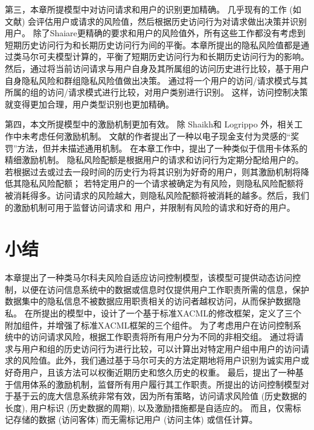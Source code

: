 第三，本章所提模型中对访问请求和用户的识别更加精确。 几乎现有的工作 (如文献\cite{wang2011quantified,shaikh2012dynamic}) 会评估用户或请求的风险值，然后根据历史访问行为对请求做出决策并识别用户。 除了Shaiare更精确的要求和用户的风险值外，所有这些工作都没有考虑到短期历史访问行为和长期历史访问行为间的平衡。本章所提出的隐私风险值都是通过类马尔可夫模型计算的，平衡了短期历史访问行为和长期历史访问行为的影响。 然后，通过将当前访问请求与用户自身及其所属组的访问历史进行比较，基于用户自身隐私风险和群组隐私风险值做出决策。 通过将一个用户的访问/请求模式与其所属的组的访问/请求模式进行比较，对用户类别进行识别。 这样，访问控制决策就变得更加合理，用户类型识别也更加精确。

第四，本文所提模型中的激励机制更加有效。 除 Shaikh和 Logrippo \cite{shaikh2012dynamic}外，相关工作中未考虑任何激励机制。 文献\cite{shaikh2012dynamic}的作者提出了一种以电子现金支付为灵感的“奖罚”方法，但并未描述通用机制。 在本章工作中，提出了一种类似于信用卡体系的精细激励机制。 隐私风险配额是根据用户的请求和访问行为定期分配给用户的。 若根据过去或过去一段时间的历史行为将其识别为好奇的用户，则其激励机制将降低其隐私风险配额； 若特定用户的一个请求被确定为有风险，则隐私风险配额将被消耗得多。访问请求的风险越大，则隐私风险配额将被消耗的越多。然后，我们的激励机制可用于监督访问请求和 用户，并限制有风险的请求和好奇的用户。

\section{小结}
\label{sec:Conclusion}

本章提出了一种类马尔科夫风险自适应访问控制模型，该模型可提供动态访问控制，以便在访问信息系统中的数据或信息时仅提供用户工作职责所需的信息，保护数据集中的隐私信息不被数据应用职责相关的访问者越权访问，从而保护数据隐私。 在所提出的模型中，设计了一个基于标准XACML的修改框架，定义了三个附加组件，并增强了标准XACML框架的三个组件。 为了考虑用户在访问控制系统中的访问请求风险，根据工作职责将所有用户分为不同的非相交组。 通过将请求与用户和组的历史访问行为进行比较，可以计算出对特定用户组中用户的访问请求的风险值。此外，我们通过基于马尔可夫的方法定期地将用户识别为诚实用户或好奇用户，且该方法可以权衡近期历史和悠久历史的权重。 最后，提出了一种基于信用体系的激励机制，监督所有用户履行其工作职责。所提出的访问控制模型对于基于云的庞大信息系统非常有效，因为所有策略，访问请求风险值 (历史数据的长度), 用户标识 (历史数据的周期), 以及激励措施都是自适应的。  而且，仅需标记存储的数据 (访问客体) 而无需标记用户 (访问主体) 或信任计算。
